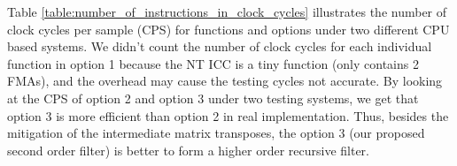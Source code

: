 
Table \ref{table:number_of_instructions_in_clock_cycles} illustrates the number of clock cycles per sample (CPS) for functions and options
under two different CPU based systems. 
We didn't count the number of clock cycles for each individual function in option 1 
because the NT ICC is a tiny function (only contains 2 FMAs),
and the overhead may cause the testing cycles not accurate. 
By looking at the CPS of option 2 and option 3 under two testing systems, we get that option 3
is more efficient than option 2 in real implementation. Thus, besides the mitigation of
the intermediate matrix transposes, the option 3 (our proposed second order filter) is better to
form a higher order recursive filter.


